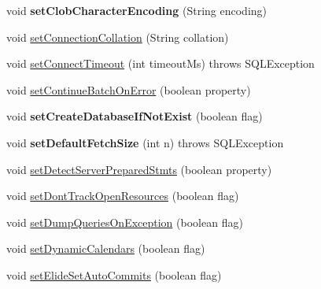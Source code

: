 \begin{DoxyCompactItemize}
void {\bfseries set\+Clob\+Character\+Encoding} (String encoding)
\item 
void \mbox{\hyperlink{classcom_1_1mysql_1_1jdbc_1_1_connection_properties_impl_a2f3f37ab6830d458a0e9ce843ad48c3d}{set\+Connection\+Collation}} (String collation)
\item 
void \mbox{\hyperlink{classcom_1_1mysql_1_1jdbc_1_1_connection_properties_impl_a216dd4e1be4e43e51b99f33f3ff86ae9}{set\+Connect\+Timeout}} (int timeout\+Ms)  throws S\+Q\+L\+Exception 
\item 
void \mbox{\hyperlink{classcom_1_1mysql_1_1jdbc_1_1_connection_properties_impl_aae01ab8d689f6a5e5450fb4609794bf0}{set\+Continue\+Batch\+On\+Error}} (boolean property)
\item 
\mbox{\label{classcom_1_1mysql_1_1jdbc_1_1_connection_properties_impl_a0f8c8add0c13d7f4a0950af4af464c1b}} 
void {\bfseries set\+Create\+Database\+If\+Not\+Exist} (boolean flag)
\item 
\mbox{\label{classcom_1_1mysql_1_1jdbc_1_1_connection_properties_impl_ac5b40007924ef56c6acbfd38ca84867d}} 
void {\bfseries set\+Default\+Fetch\+Size} (int n)  throws S\+Q\+L\+Exception 
\item 
void \mbox{\hyperlink{classcom_1_1mysql_1_1jdbc_1_1_connection_properties_impl_aa0b17bd1412f33072d6bbc81a7686c2a}{set\+Detect\+Server\+Prepared\+Stmts}} (boolean property)
\item 
void \mbox{\hyperlink{classcom_1_1mysql_1_1jdbc_1_1_connection_properties_impl_ac68d654ad20072f4dc67c5a4aa576c8b}{set\+Dont\+Track\+Open\+Resources}} (boolean flag)
\item 
void \mbox{\hyperlink{classcom_1_1mysql_1_1jdbc_1_1_connection_properties_impl_a10091184059369f2348483fbcaf07d32}{set\+Dump\+Queries\+On\+Exception}} (boolean flag)
\item 
void \mbox{\hyperlink{classcom_1_1mysql_1_1jdbc_1_1_connection_properties_impl_a776e811b9c832597d1b8d1d0da0f7e5a}{set\+Dynamic\+Calendars}} (boolean flag)
\item 
void \mbox{\hyperlink{classcom_1_1mysql_1_1jdbc_1_1_connection_properties_impl_acb5e889f55e3a05564dab69fcf819b86}{set\+Elide\+Set\+Auto\+Commits}} (boolean flag)
\item 
\mbox{\label{classcom_1_1mysql_1_1jdbc_1_1_connection_properties_impl_a119e8b220568e0679bb6abbf7632d46b}} 

\end{DoxyCompactItemize}
